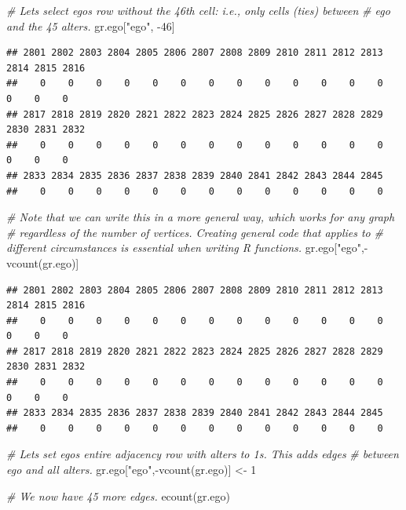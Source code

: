 \documentclass[
]{book}
\newenvironment{Shaded}{\begin{snugshade}}{\end{snugshade}}
\newcommand{\CommentTok}[1]{\textcolor[rgb]{0.56,0.35,0.01}{\textit{#1}}}
\newcommand{\DecValTok}[1]{\textcolor[rgb]{0.00,0.00,0.81}{#1}}
\newcommand{\FunctionTok}[1]{\textcolor[rgb]{0.00,0.00,0.00}{#1}}
\newcommand{\NormalTok}[1]{#1}
\newcommand{\OtherTok}[1]{\textcolor[rgb]{0.56,0.35,0.01}{#1}}
\newcommand{\SpecialCharTok}[1]{\textcolor[rgb]{0.00,0.00,0.00}{#1}}
\newcommand{\StringTok}[1]{\textcolor[rgb]{0.31,0.60,0.02}{#1}}
\begin{document}
\begin{Shaded}
\begin{Highlighting}[]
\CommentTok{\# Let\textquotesingle{}s select ego\textquotesingle{}s row without the 46th cell: i.e., only cells (ties) between}
\CommentTok{\# ego and the 45 alters. }
\NormalTok{gr.ego[}\StringTok{"ego"}\NormalTok{, }\SpecialCharTok{{-}}\DecValTok{46}\NormalTok{]}
\end{Highlighting}
\end{Shaded}

\begin{verbatim}
## 2801 2802 2803 2804 2805 2806 2807 2808 2809 2810 2811 2812 2813 2814 2815 2816 
##    0    0    0    0    0    0    0    0    0    0    0    0    0    0    0    0 
## 2817 2818 2819 2820 2821 2822 2823 2824 2825 2826 2827 2828 2829 2830 2831 2832 
##    0    0    0    0    0    0    0    0    0    0    0    0    0    0    0    0 
## 2833 2834 2835 2836 2837 2838 2839 2840 2841 2842 2843 2844 2845 
##    0    0    0    0    0    0    0    0    0    0    0    0    0
\end{verbatim}

\begin{Shaded}
\begin{Highlighting}[]
\CommentTok{\# Note that we can write this in a more general way, which works for any graph}
\CommentTok{\# regardless of the number of vertices. Creating general code that applies to}
\CommentTok{\# different circumstances is essential when writing R functions.}
\NormalTok{gr.ego[}\StringTok{"ego"}\NormalTok{,}\SpecialCharTok{{-}}\FunctionTok{vcount}\NormalTok{(gr.ego)]}
\end{Highlighting}
\end{Shaded}

\begin{verbatim}
## 2801 2802 2803 2804 2805 2806 2807 2808 2809 2810 2811 2812 2813 2814 2815 2816 
##    0    0    0    0    0    0    0    0    0    0    0    0    0    0    0    0 
## 2817 2818 2819 2820 2821 2822 2823 2824 2825 2826 2827 2828 2829 2830 2831 2832 
##    0    0    0    0    0    0    0    0    0    0    0    0    0    0    0    0 
## 2833 2834 2835 2836 2837 2838 2839 2840 2841 2842 2843 2844 2845 
##    0    0    0    0    0    0    0    0    0    0    0    0    0
\end{verbatim}

\begin{Shaded}
\begin{Highlighting}[]
\CommentTok{\# Let\textquotesingle{}s set ego\textquotesingle{}s entire adjacency row with alters to 1\textquotesingle{}s. This adds edges}
\CommentTok{\# between ego and all alters.}
\NormalTok{gr.ego[}\StringTok{"ego"}\NormalTok{,}\SpecialCharTok{{-}}\FunctionTok{vcount}\NormalTok{(gr.ego)] }\OtherTok{\textless{}{-}} \DecValTok{1}

\CommentTok{\# We now have 45 more edges.}
\FunctionTok{ecount}\NormalTok{(gr.ego)}
\end{Highlighting}
\end{Shaded}
\end{document}
